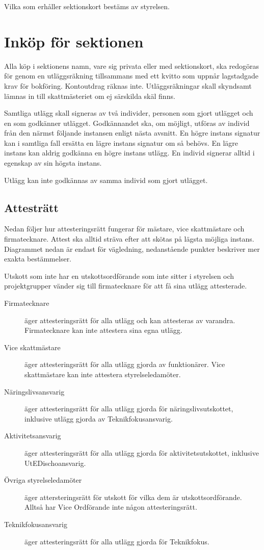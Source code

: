 \documentclass{dsekprotokoll}
\begin{document}
Vilka som erhåller sektionskort bestäms av styrelsen.

\section{Inköp för sektionen}
Alla köp i sektionens namn, vare sig privata eller med sektionskort, 
ska redogöras för genom en utläggsräkning tillsammans med ett kvitto som uppnår lagstadgade
krav för bokföring. Kontoutdrag räknas inte. Utläggsräkningar skall skyndsamt lämnas in till
skattmästeriet om ej särskilda skäl finns.

Samtliga utlägg skall signeras av två individer, personen som gjort utlägget och
en som godkänner utlägget. Godkännandet ska, om möjligt, utföras av individ
från den närmst följande instansen enligt nästa avsnitt. En högre instans
signatur kan i samtliga fall ersätta en lägre instans signatur om så
behövs. En lägre instans kan aldrig godkänna en högre instans utlägg. En individ
signerar alltid i egenskap av sin högsta instans.

Utlägg kan inte godkännas av samma individ som gjort utlägget.

\subsection{Attesträtt}
Nedan följer hur attesteringsrätt fungerar för mästare, vice skattmästare och
firmatecknare.  Attest ska alltid sträva efter att skötas på lägsta möjliga
instans. Diagrammet nedan är endast för vägledning, nedanstående punkter
beskriver mer exakta bestämmelser.

Utskott som inte har en utskottsordförande som inte sitter i styrelsen och
projektgrupper vänder sig till firmatecknare för att få sina utlägg
attesterade.

\begin{description}
  \item[Firmatecknare] äger attesteringsrätt för alla utlägg och kan attesteras
    av varandra. Firmatecknare kan inte attestera sina egna utlägg.
  \item[Vice skattmästare] äger attesteringsrätt för alla utlägg gjorda av
    funktionärer. Vice skattmästare kan inte attestera styrelseledamöter.
  \item[Näringslivsansvarig] äger attesteringsrätt för alla utlägg gjorda för
    näringslivsutskottet, inklusive utlägg gjorda av Teknikfokusansvarig.
  \item[Aktivitetsansvarig] äger attesteringsrätt för alla utlägg gjorda för
    aktivitetsutskottet, inklusive UtEDischoansvarig.
  \item[Övriga styrelseledamöter] äger attersteringsrätt för utskott för vilka
    dem är utskottsordförande. Alltså har Vice Ordförande inte någon
    attesteringsrätt.
  \item[Teknikfokusansvarig] äger attesteringsrätt för alla utlägg gjorda för
    Teknikfokus.
\end{description}
\end{document}
